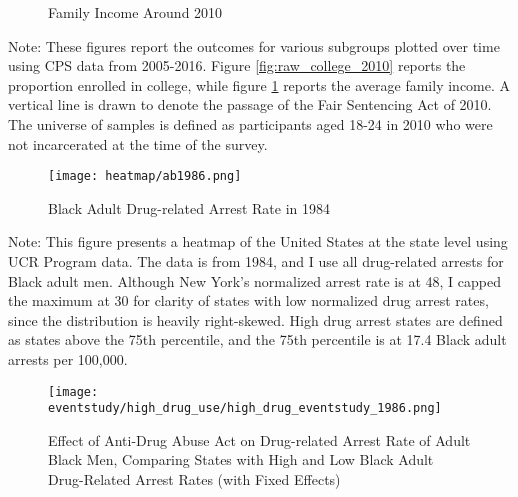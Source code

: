   \begin{figure}[h]
    \centering
    \caption{Family Income Around 2010}%
    \qquad
    \label{fig:raw_faminc_2010}%
  \end{figure}
  
  \begin{footnotesize}
    \noindent Note: These figures report the outcomes for various subgroups plotted over time using CPS data from 2005-2016. Figure \ref{fig:raw_college_2010} reports the proportion enrolled in college, while figure \ref{fig:raw_faminc_2010} reports the average family income. A vertical line is drawn to denote the passage of the Fair Sentencing Act of 2010. The universe of samples is defined as participants aged 18-24 in 2010 who were not incarcerated at the time of the survey.
  \end{footnotesize}
  
  \clearpage

  \begin{figure}[h]
    \caption{Black Adult Drug-related Arrest Rate in 1984}
    \centering
    \texttt{[image: heatmap/ab1986.png]}
    \label{fig:heatmap}
  \end{figure}

  \begin{footnotesize}
    \noindent Note: This figure presents a heatmap of the United States at the state level using UCR Program data. The data is from 1984, and I use all drug-related arrests for Black adult men. Although New York's normalized arrest rate is at 48, I capped the maximum at 30 for clarity of states with low normalized drug arrest rates, since the distribution is heavily right-skewed. High drug arrest states are defined as states above the 75th percentile, and the 75th percentile is at 17.4 Black adult arrests per 100,000.
  \end{footnotesize}
  
  \clearpage
  \begin{figure}[h]
    \caption{Effect of Anti-Drug Abuse Act on Drug-related Arrest Rate of Adult Black Men, Comparing States with High and Low Black Adult Drug-Related Arrest Rates (with Fixed Effects)}
    \centering
    \texttt{[image: eventstudy/high\_drug\_use/high\_drug\_eventstudy\_1986.png]}
    \label{fig:ab_es_1986}
  \end{figure}

